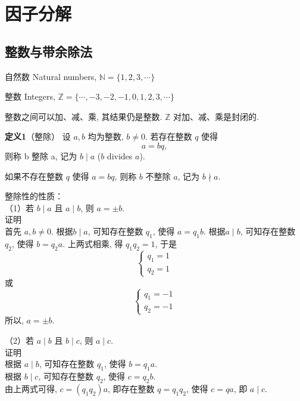 \section{因子分解}
\subsection{整数与带余除法}

自然数 Natural numbers, 
$ \mathbb{N} = \{ 1, 2, 3, \cdots \} $

整数 Integers, 
$ \mathbb{Z} = \{ \cdots, -3, -2, -1, 0, 1, 2, 3, \cdots \} $

整数之间可以加、减、乘, 其结果仍是整数. $ \mathbb{Z} $ 对加、减、乘是封闭的. 

\textbf{定义1}（整除） 设 $a, b$ 均为整数, $ b \neq 0 $. 若存在整数 $ q $ 使得
\[ 
    a = bq,
\]
则称 b 整除 a, 记为 $ b \mid a $ ($b$ divides $a$). 

如果不存在整数 $q$ 使得 $a=bq$, 则称 $b$ 不整除 $a$, 记为 $b \nmid a$. 

整除性的性质：\\
（1）若 $ b \mid a $ 且 $ a \mid b$, 则 $a = \pm b$.\\
证明\\
首先 $a,b\neq 0$.
根据$ b \mid a $, 可知存在整数 $q_1$, 使得 $a=q_1 b$. 
根据$ a \mid b$, 可知存在整数 $q_2$, 使得 $b=q_2 a$. 
上两式相乘, 得 $q_1 q_2 = 1$, 于是\\
\[
    \left\{ 
        \begin{array}{lc}
            q_1 = 1\\
            q_2 = 1
        \end{array}
    \right.
\]
或
\[
    \left\{ 
        \begin{array}{lc}
            q_1 = -1\\
            q_2 = -1
        \end{array}
    \right.
\]
所以, $a = \pm b$.

（2）若 $ a \mid b $ 且 $ b \mid c $, 则 $a \mid c$.\\
证明\\
根据 $a\mid b$, 可知存在整数 $q_1$, 使得 $b=q_1 a$.\\
根据 $b\mid c$, 可知存在整数 $q_2$, 使得 $c=q_2 b$.\\
由上两式可得, $c=(q_1q_2)a$, 即存在整数 $q=q_1q_2$, 使得 $c=qa$, 即 $a \mid c$.

